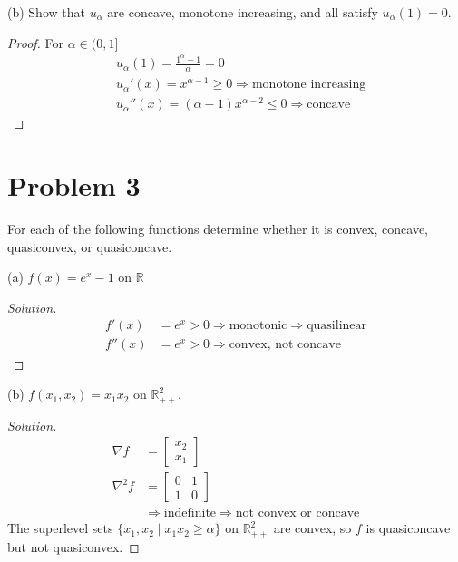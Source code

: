 \documentclass[11pt]{article}
\newenvironment{solution}
  {\renewcommand\qedsymbol{$\square$}\begin{proof}[Solution]}
  {\end{proof}}
\newcommand{\grad}{\nabla}
\newcommand{\hess}{\nabla^2}
\newcommand{\RR}{\mathbb{R}}
\begin{document}
(b) Show that $u_\alpha$ are concave, monotone increasing, and all satisfy $u_\alpha(1) = 0$.

\begin{proof}
  For $\alpha\in(0, 1]$
  \begin{align*}
    &u_\alpha(1) = \frac{1^\alpha - 1}{\alpha} = 0\\
    &u_\alpha'(x) = x^{\alpha-1}\geq0 \Rightarrow\text{monotone increasing}\\
    &u_\alpha''(x) = (\alpha-1)x^{\alpha-2} \leq 0 \Rightarrow\text{concave}
  \end{align*}
\end{proof}

\clearpage
\section*{Problem 3}
For each of the following functions determine whether it is convex, concave, quasiconvex, or quasiconcave.

(a) $f(x)=e^x-1$ on $\RR$
\begin{solution}
  \begin{align*}
    f'(x) &= e^x > 0 \Rightarrow \text{monotonic} \Rightarrow \text{quasilinear}\\
    f''(x) &= e^x > 0 \Rightarrow \text{convex, not concave}
  \end{align*}
\end{solution}

(b) $f\left(x_1, x_2\right)=x_1 x_2$ on $\RR_{++}^2$.
\begin{solution}
  \begin{align*}
    \grad f &= 
    \begin{bmatrix}
      x_2 \\x_1
    \end{bmatrix}\\
    \hess f &= 
    \begin{bmatrix}
      0 & 1\\1 & 0
    \end{bmatrix} \\
    &\Rightarrow \text{indefinite} \Rightarrow \text{not convex or concave}
  \end{align*}
  The superlevel sets $\{x_1, x_2\mid x_1x_2\geq \alpha\}$ on $\RR^2_{++}$ are convex, so $f$ is quasiconcave but not quasiconvex.
\end{solution}
\end{document}
